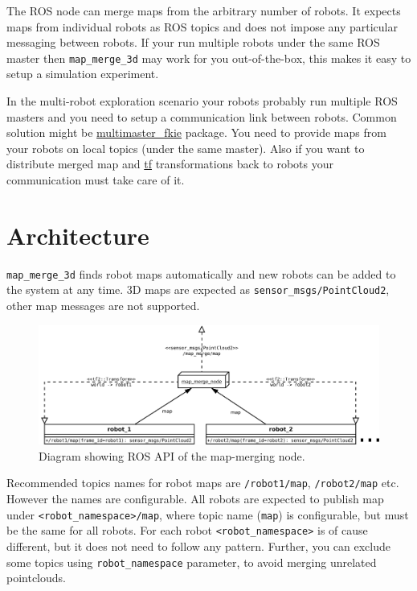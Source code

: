 The \gls{ROS} node can merge maps from the arbitrary number of robots. It expects maps from individual robots as \gls{ROS} topics and does not impose any particular messaging between robots. If your run multiple robots under the same \gls{ROS} master then \texttt{map\_merge\_3d} may work for you out-of-the-box, this makes it easy to setup a simulation experiment.

In the multi-robot exploration scenario your robots probably run multiple \gls{ROS} masters and you need to setup a communication link between robots. Common solution might be \href{http://wiki.ros.org/multimaster_fkie}{multimaster\_fkie} package. You need to provide maps from your robots on local topics (under the same master). Also if you want to distribute merged map and \href{http://wiki.ros.org/tf}{tf} transformations back to robots your communication must take care of it.

\section{Architecture}

\texttt{map\_merge\_3d} finds robot maps automatically and new robots can be added to the system at any time. \gls{3D} maps are expected as \texttt{sensor\_msgs/PointCloud2}, other map messages are not supported.

\begin{figure}
    \centering
    \includegraphics[width=\textwidth]{../img/architecture.pdf}
    \caption[The architecture of the \texttt{map\_merge\_node}]{Diagram showing \gls{ROS} \gls{API} of the map-merging node.}
    \label{fig:architecture}
\end{figure}

Recommended topics names for robot maps are \texttt{/robot1/map}, \texttt{/robot2/map} etc. However the names are configurable. All robots are expected to publish map under \texttt{<robot\_namespace>/map}, where topic name (\texttt{map}) is configurable, but must be the same for all robots. For each robot \texttt{<robot\_namespace>} is of cause different, but it does not need to follow any pattern. Further, you can exclude some topics using \texttt{robot\_namespace} parameter, to avoid merging unrelated pointclouds.

